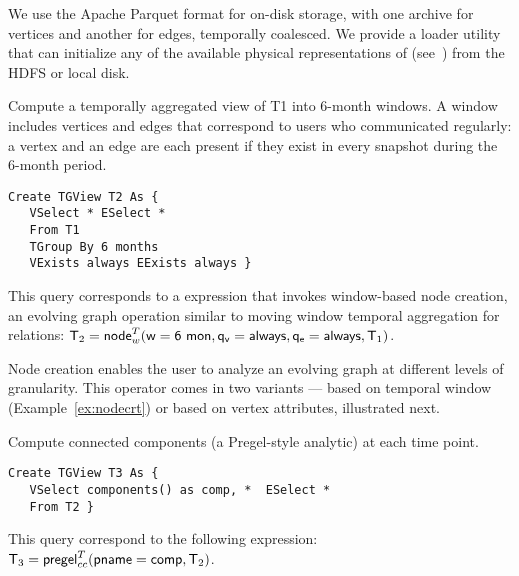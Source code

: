 We use the Apache Parquet format for on-disk storage, with one archive
for vertices and another for edges, temporally coalesced.  We provide
a loader utility that can initialize any of the available physical
representations of \tgs (see~\cite{PortalarXiv2016}) from the HDFS or
local disk.

\begin{example}
\label{ex:nodecrt}

Compute a temporally aggregated view of T1 into 6-month windows.  A
window includes vertices and edges that correspond to users who
communicated regularly: a vertex and an edge are each present if they
exist in every snapshot during the 6-month period.

\begin{small} 
\begin{verbatim}
Create TGView T2 As { 
   VSelect * ESelect *
   From T1
   TGroup By 6 months
   VExists always EExists always }
\end{verbatim}
\end{small}

This query corresponds to a \tga expression that invokes window-based
node creation, an evolving graph operation similar to moving window
temporal aggregation for relations:
$\mathsf{T}_2 = \textsf{node}^T_w(\mathsf{w=6~mon},\mathsf{q_v=always},\mathsf{q_e=always},\mathsf{T}_1)$.

\end{example}

Node creation enables the user to analyze an evolving graph at
different levels of granularity.  This operator comes in two variants
--- based on temporal window (Example~\ref{ex:nodecrt}) or based
on vertex attributes, illustrated next.

\begin{example}
\label{ex:cc}

Compute connected components (a Pregel-style analytic) at each time
point. 

\begin{small} 
\begin{verbatim}
Create TGView T3 As { 
   VSelect components() as comp, *  ESelect *
   From T2 }
\end{verbatim}
\end{small}

This query correspond to the following \tga expression:
$\mathsf{T}_3 = \textsf{pregel}^T_{cc} (\mathsf{pname=comp}, \mathsf{T}_2)$.

\end{example}

